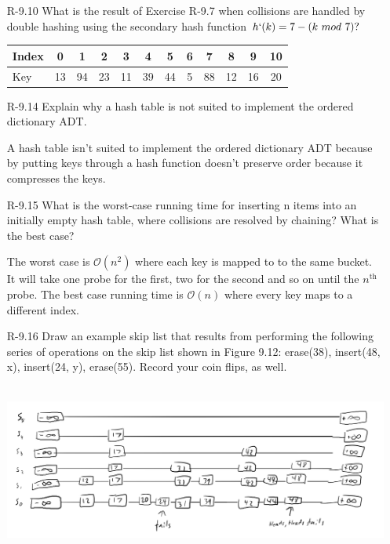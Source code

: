 \begin{itemize}
    \item[R-9.10]  What is the result of Exercise R-9.7 when collisions are handled by double
          hashing using the secondary hash function $h` (k) = 7 - (k \ mod\  7)?$

          \answer
          \begin{center}
              \begin{tabular}{|l|*{11}{c|}}
                  \hline
                  Index & 0  & 1  & 2  & 3  & 4  & 5  & 6 & 7  & 8  & 9  & 10 \\
                  \hline
                  Key   & 13 & 94 & 23 & 11 & 39 & 44 & 5 & 88 & 12 & 16 & 20 \\
                  \hline
              \end{tabular}
          \end{center}

    \item[R-9.14] Explain why a hash table is not suited to implement the ordered dictionary ADT.

          \answer A hash table isn't suited to implement the ordered dictionary ADT because by putting keys
          through a hash function doesn't preserve order because it compresses the keys.

    \item [R-9.15] What is the worst-case running time for inserting n items into an initially
          empty hash table, where collisions are resolved by chaining? What is the
          best case?

          \answer The worst case is $\mathcal{O}(n^2)$ where each key is mapped to to the same bucket.
          It will take one probe for the first, two for the second and so on until the $n^{\text{th}}$
          probe. The best case running time is $\mathcal{O}(n)$ where every key maps to a different index.

    \item[R-9.16] Draw an example skip list that results from performing the following
          series of operations on the skip list shown in Figure 9.12: erase(38),
          insert(48, x), insert(24, y), erase(55). Record your coin flips, as well.

          \answer \\
          \includegraphics[scale=.6]{img/R_9_16_skiplist.png}
          \newpage


\end{itemize}
